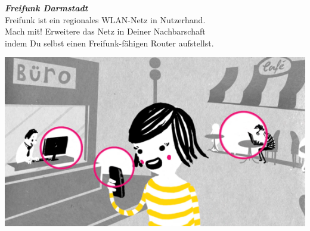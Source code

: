 \documentclass[a4paper]{article}
\begin{document}
\thispagestyle{empty}

\begin{center}
\Huge \textit{\textbf{\textcolor{freifunkpink}{Freifunk Darmstadt}}} \\
\vspace{0.6cm}
\large
Freifunk ist ein regionales WLAN-Netz in Nutzerhand.\\
Mach mit! Erweitere das Netz in Deiner Nachbarschaft\\
indem Du selbst einen Freifunk-fähigen Router aufstellst.\\
\normalsize

\vspace{1.7cm}

\hspace*{-0.05 \paperwidth}\includegraphics[width=\paperwidth]{../images/city_center}
\end{center}

\vspace{0.8cm}
\end{document}
